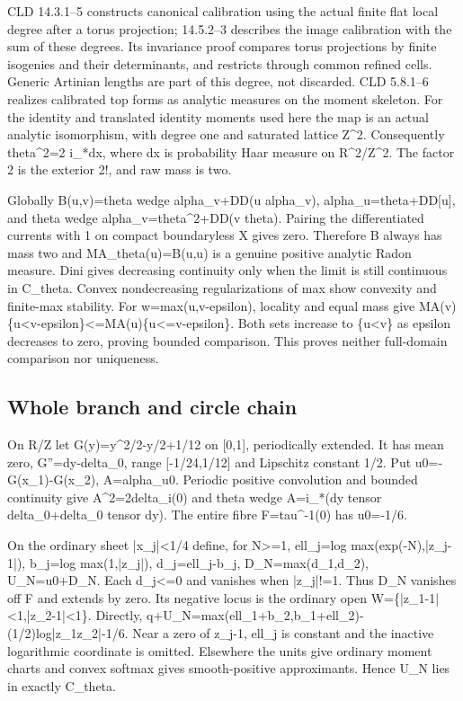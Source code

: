 \documentclass[11pt]{article}
\begin{document}
CLD 14.3.1--5 constructs canonical calibration using the actual finite flat local degree after a torus projection; 14.5.2--3 describes the image calibration with the sum of these degrees. Its invariance proof compares torus projections by finite isogenies and their determinants, and restricts through common refined cells. Generic Artinian lengths are part of this degree, not discarded. CLD 5.8.1--6 realizes calibrated top forms as analytic measures on the moment skeleton. For the identity and translated identity moments used here the map is an actual analytic isomorphism, with degree one and saturated lattice Z\textasciicircum{}2. Consequently theta\textasciicircum{}2=2 i\_*dx, where dx is probability Haar measure on R\textasciicircum{}2/Z\textasciicircum{}2. The factor 2 is the exterior 2!, and raw mass is two.

Globally B(u,v)=theta wedge alpha\_v+DD(u alpha\_v), alpha\_u=theta+DD[u], and theta wedge alpha\_v=theta\textasciicircum{}2+DD(v theta). Pairing the differentiated currents with 1 on compact boundaryless X gives zero. Therefore B always has mass two and MA\_theta(u)=B(u,u) is a genuine positive analytic Radon measure. Dini gives decreasing continuity only when the limit is still continuous in C\_theta. Convex nondecreasing regularizations of max show convexity and finite-max stability. For w=max(u,v-epsilon), locality and equal mass give MA(v)\{u<v-epsilon\}<=MA(u)\{u<=v-epsilon\}. Both sets increase to \{u<v\} as epsilon decreases to zero, proving bounded comparison. This proves neither full-domain comparison nor uniqueness.

\subsection*{Whole branch and circle chain}

On R/Z let G(y)=y\textasciicircum{}2/2-y/2+1/12 on [0,1], periodically extended. It has mean zero, G''=dy-delta\_0, range [-1/24,1/12] and Lipschitz constant 1/2. Put u0=-G(x\_1)-G(x\_2), A=alpha\_u0. Periodic positive convolution and bounded continuity give A\textasciicircum{}2=2delta\_i(0) and theta wedge A=i\_*(dy tensor delta\_0+delta\_0 tensor dy). The entire fibre F=tau\textasciicircum{}-1(0) has u0=-1/6.

On the ordinary sheet |x\_j|<1/4 define, for N>=1, ell\_j=log max(exp(-N),|z\_j-1|), b\_j=log max(1,|z\_j|), d\_j=ell\_j-b\_j, D\_N=max(d\_1,d\_2), U\_N=u0+D\_N. Each d\_j<=0 and vanishes when |z\_j|!=1. Thus D\_N vanishes off F and extends by zero. Its negative locus is the ordinary open W=\{|z\_1-1|<1,|z\_2-1|<1\}. Directly, q+U\_N=max(ell\_1+b\_2,b\_1+ell\_2)-(1/2)log|z\_1z\_2|-1/6. Near a zero of z\_j-1, ell\_j is constant and the inactive logarithmic coordinate is omitted. Elsewhere the units give ordinary moment charts and convex softmax gives smooth-positive approximants. Hence U\_N lies in exactly C\_theta.
\end{document}
